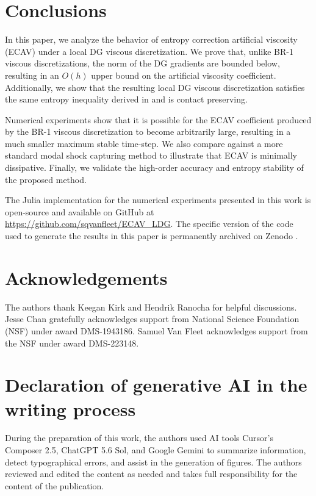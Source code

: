 \documentclass{elsarticle}
\theoremstyle{definition}
\theoremstyle{plain}
\theoremstyle{plain}
\begin{document}
\section{Conclusions}\label{sec:section_6}

In this paper, we analyze the behavior of entropy correction artificial viscosity (ECAV) \cite{chan2025artificial} under a local DG viscous discretization. We prove that, unlike BR-1 viscous discretizations, the norm of the DG gradients are bounded below, resulting in an $O(h)$ upper bound on the artificial viscosity coefficient. Additionally, we show that the resulting local DG viscous discretization satisfies the same entropy inequality derived in \cite{chan2025artificial} and is contact preserving.

Numerical experiments show that it is possible for the ECAV coefficient produced by the BR-1 viscous discretization to become arbitrarily large, resulting in a much smaller maximum stable time-step. We also compare against a more standard modal shock capturing method to illustrate that ECAV is minimally dissipative. Finally, we validate the high-order accuracy and entropy stability of the proposed method. 


The Julia implementation for the numerical experiments presented in this work is open-source and available on GitHub at \url{https://github.com/sqvanfleet/ECAV\_LDG}. The specific version of the code used to generate the results in this paper is permanently archived on Zenodo \cite{zenodo_ECAV_LDG}.

\section{Acknowledgements}

The authors thank Keegan Kirk and Hendrik Ranocha for helpful discussions. Jesse Chan gratefully acknowledges support from National Science Foundation (NSF) under award DMS-1943186. Samuel Van Fleet acknowledges support from the NSF under award DMS-223148. 

\section{Declaration of generative AI in the writing process}

During the preparation of this work, the authors used AI tools Cursor's Composer 2.5, ChatGPT 5.6 Sol, and Google Gemini to summarize information, detect typographical errors, and assist in the generation of figures. The authors reviewed and edited the content as needed and takes full responsibility for the content of the publication.



\end{document}
